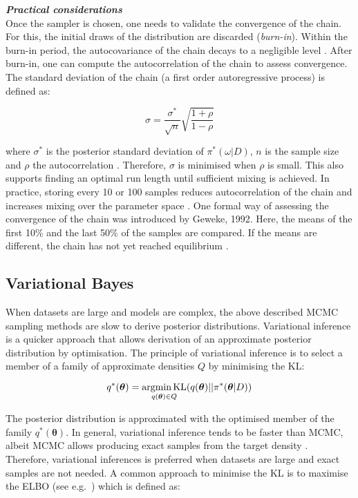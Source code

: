 \textbf{\textit{Practical considerations}}\\

Once the sampler is chosen, one needs to validate the convergence of the chain. For this, the initial draws of the distribution are discarded (\emph{burn-in}). Within the burn-in period, the autocovariance of the chain decays to a negligible level \citep{Greyer1992}. After burn-in, one can compute the autocorrelation of the chain to assess convergence. The standard deviation of the chain (a first order autoregressive process) is defined as:

\begin{equation}
\sigma=\frac{\sigma^*}{\sqrt{n}}\sqrt{\frac{1+\rho}{1-\rho}}
\end{equation}

where $\sigma^*$ is the posterior standard deviation of $\pi^*(\omega|D)$, $n$ is the sample size and $\rho$ the autocorrelation \citep{Tierney1991}. Therefore, $\sigma$ is minimised when $\rho$ is small. This also supports finding an optimal run length until sufficient mixing is achieved. In practice, storing every 10 or 100 samples reduces autocorrelation of the chain and increases mixing over the parameter space \citep{Greyer1992}. One formal way of assessing the convergence of the chain was introduced by Geweke, 1992. Here, the means of the first 10\% and the last 50\% of the samples are compared. If the means are different, the chain has not yet reached equilibrium \citep{Geweke1992}.

\subsection{Variational Bayes}

When datasets are large and models are complex, the above described MCMC sampling methods are slow to derive posterior distributions. Variational inference is a quicker approach that allows derivation of an approximate posterior distribution by optimisation. The principle of variational inference is to select a member of a family of approximate densities $Q$ by minimising the \gls{KL}:

\begin{equation}
q^\ast(\bm{\theta})=\underset{q(\bm{\theta})\in{}Q}{\textnormal{argmin\,{}KL}}(q(\bm{\theta})||\pi^*(\bm{\theta}|D))
\end{equation}

The posterior distribution is approximated with the optimised member of the family $q^\ast(\bm{\theta})$\citep{Blei2017}. In general, variational inference tends to be faster than MCMC, albeit MCMC allows producing exact samples from the target density \citep{Blei2017}. Therefore, variational inferences is preferred when datasets are large and exact samples are not needed. A common approach to minimise the KL is to maximise the \gls{ELBO} (see e.g.~\citep{Beal2003}) which is defined as:

